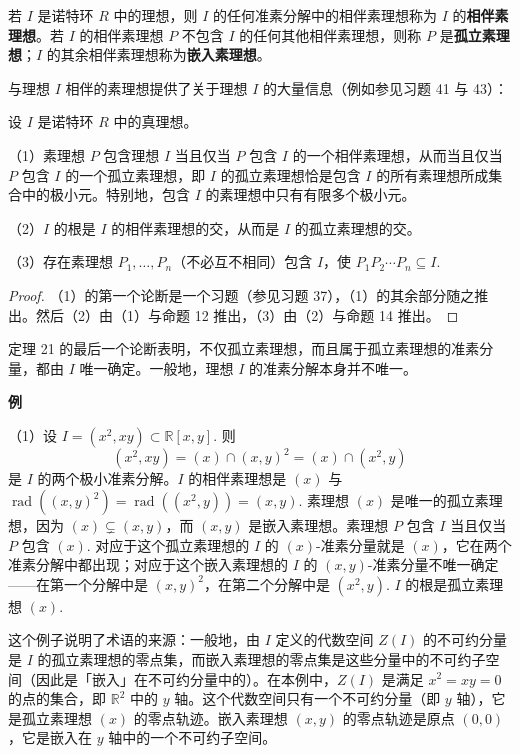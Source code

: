 \begin{definition}
若 \(I\) 是诺特环 \(R\) 中的理想，则 \(I\) 的任何准素分解中的相伴素理想称为 \(I\) 的\textbf{相伴素理想}。若 \(I\) 的相伴素理想 \(P\) 不包含 \(I\) 的任何其他相伴素理想，则称 \(P\) 是\textbf{孤立素理想}；\(I\) 的其余相伴素理想称为\textbf{嵌入素理想}。
\end{definition}

与理想 \(I\) 相伴的素理想提供了关于理想 \(I\) 的大量信息（例如参见习题 41 与 43）：

\begin{corollary}\label{cor:15.22}
设 \(I\) 是诺特环 \(R\) 中的真理想。

（1）素理想 \(P\) 包含理想 \(I\) 当且仅当 \(P\) 包含 \(I\) 的一个相伴素理想，从而当且仅当 \(P\) 包含 \(I\) 的一个孤立素理想，即 \(I\) 的孤立素理想恰是包含 \(I\) 的所有素理想所成集合中的极小元。特别地，包含 \(I\) 的素理想中只有有限多个极小元。

（2）\(I\) 的根是 \(I\) 的相伴素理想的交，从而是 \(I\) 的孤立素理想的交。

（3）存在素理想 \(P_1, \ldots, P_n\)（不必互不相同）包含 \(I\)，使 \(P_1P_2\cdots P_n \subseteq I\).
\end{corollary}

\begin{proof}
（1）的第一个论断是一个习题（参见习题 37），（1）的其余部分随之推出。然后（2）由（1）与命题 12 推出，（3）由（2）与命题 14 推出。
\end{proof}

定理 21 的最后一个论断表明，不仅孤立素理想，而且属于孤立素理想的准素分量，都由 \(I\) 唯一确定。一般地，理想 \(I\) 的准素分解本身并不唯一。

\noindent\textbf{例}

（1）设 \(I = (x^2, xy) \subset \mathbb{R}[x,y]\). 则
\[
(x^2, xy) = (x) \cap (x,y)^2 = (x) \cap (x^2, y)
\]
是 \(I\) 的两个极小准素分解。\(I\) 的相伴素理想是 \((x)\) 与 \(\operatorname{rad}((x,y)^2) = \operatorname{rad}((x^2,y)) = (x,y)\). 素理想 \((x)\) 是唯一的孤立素理想，因为 \((x) \subsetneq (x,y)\)，而 \((x,y)\) 是嵌入素理想。素理想 \(P\) 包含 \(I\) 当且仅当 \(P\) 包含 \((x)\). 对应于这个孤立素理想的 \(I\) 的 \((x)\)-准素分量就是 \((x)\)，它在两个准素分解中都出现；对应于这个嵌入素理想的 \(I\) 的 \((x,y)\)-准素分量不唯一确定——在第一个分解中是 \((x,y)^2\)，在第二个分解中是 \((x^2,y)\). \(I\) 的根是孤立素理想 \((x)\).

这个例子说明了术语的来源：一般地，由 \(I\) 定义的代数空间 \(Z(I)\) 的不可约分量是 \(I\) 的孤立素理想的零点集，而嵌入素理想的零点集是这些分量中的不可约子空间（因此是「嵌入」在不可约分量中的）。在本例中，\(Z(I)\) 是满足 \(x^2 = xy = 0\) 的点的集合，即 \(\mathbb{R}^2\) 中的 \(y\) 轴。这个代数空间只有一个不可约分量（即 \(y\) 轴），它是孤立素理想 \((x)\) 的零点轨迹。嵌入素理想 \((x,y)\) 的零点轨迹是原点 \((0,0)\)，它是嵌入在 \(y\) 轴中的一个不可约子空间。

